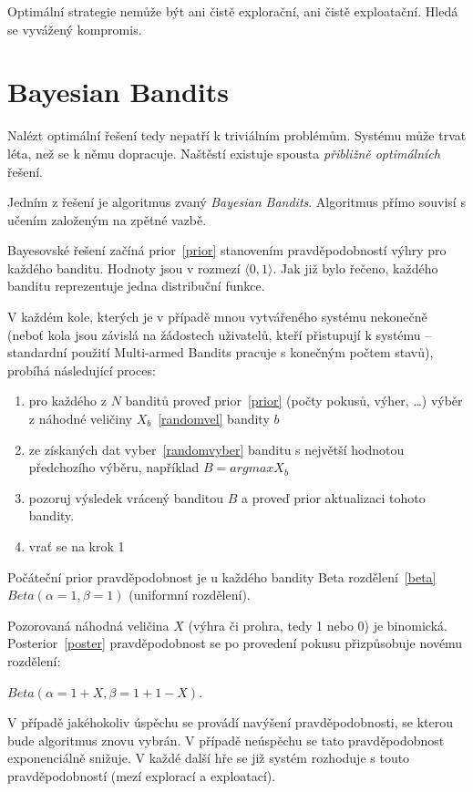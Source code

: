 \documentclass[thesis=M,czech]{FITthesis}[2014/05/07]
\begin{document}
Optimální strategie nemůže být ani čistě explorační, ani čistě exploatační. Hledá se vyvážený kompromis.

\section{Bayesian Bandits}
Nalézt optimální řešení tedy nepatří k triviálním problémům. Systému může trvat léta, než se k němu dopracuje. Naštěstí existuje spousta \emph{přibližně optimálních} řešení.

Jedním z řešení je algoritmus zvaný \emph{Bayesian Bandits}. Algoritmus přímo souvisí s učením založeným na zpětné vazbě.

Bayesovské řešení začíná prior~\ref{prior} stanovením pravděpodobností výhry pro každého banditu. Hodnoty jsou v rozmezí $\langle0,1\rangle$. Jak již bylo řečeno, každého banditu reprezentuje jedna distribuční funkce.

V každém kole, kterých je v případě mnou vytvářeného systému nekonečně (neboť kola jsou závislá na žádostech uživatelů, kteří přistupují k systému – standardní použití Multi-armed Bandits pracuje s konečným počtem stavů), probíhá následující proces:

\begin{enumerate}
	\item pro každého z $N$ banditů proveď prior~\ref{prior} (počty pokusů, výher, \ldots) výběr z náhodné veličiny $X_b$~\ref{randomvel} bandity $b$
	\item ze získaných dat vyber~\ref{randomvyber} banditu s největší hodnotou předchozího výběru, například $B = argmax X_b$	
	\item pozoruj výsledek vrácený banditou $B$ a proveď prior aktualizaci tohoto bandity.
	\item vrať se na krok 1
\end{enumerate}

Počáteční prior pravděpodobnost je u každého bandity Beta rozdělení~\ref{beta} ${Beta}(\alpha = 1, \beta = 1)$ (uniformní rozdělení).

Pozorovaná náhodná veličina $X$ (výhra či prohra, tedy 1 nebo 0) je binomická. Posterior~\ref{poster} pravděpodobnost se po provedení pokusu přizpůsobuje novému rozdělení:

\begin{center}
${Beta}(\alpha = 1 + X, \beta = 1 + 1 - X)$.
\end{center}

V případě jakéhokoliv úspěchu se provádí navýšení pravděpodobnosti, se kterou bude algoritmus znovu vybrán. V případě neúspěchu se tato pravděpodobnost exponenciálně snižuje. V každé další hře se již systém rozhoduje s touto pravděpodobností (mezí explorací a exploatací).
\end{document}

